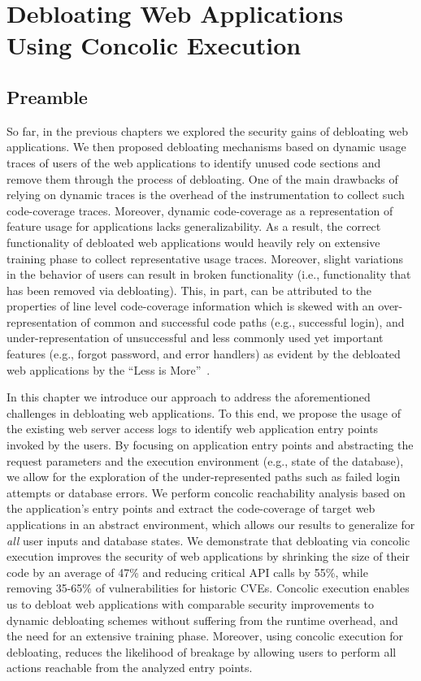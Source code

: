 \chapter{Debloating Web Applications Using Concolic Execution}
\label{chap:ad}
\section*{Preamble}

So far, in the previous chapters we explored the security gains of debloating web applications. 
We then proposed debloating mechanisms based on dynamic usage traces of users of the web applications to identify unused code sections and remove them through the process of debloating. 
One of the main drawbacks of relying on dynamic traces is the overhead of the instrumentation to collect such code-coverage traces. 
Moreover, dynamic code-coverage as a representation of feature usage for applications lacks generalizability. 
As a result, the correct functionality of debloated web applications would heavily rely on extensive training phase to collect representative usage traces. 
Moreover, slight variations in the behavior of users can result in broken functionality (i.e., functionality that has been removed via debloating). 
This, in part, can be attributed to the properties of line level code-coverage information which is skewed with an over-representation of common and successful code paths (e.g., successful login), and under-representation of unsuccessful and less commonly used yet important features (e.g., forgot password, and error handlers) as evident by the debloated web applications by the ``Less is More''~\cite{azad2019less}.

In this chapter we introduce our approach to address the aforementioned challenges in debloating web applications. 
To this end, we propose the usage of the existing web server access logs to identify web application entry points invoked by the users. 
By focusing on application entry points and abstracting the request parameters and the execution environment (e.g., state of the database), we allow for the exploration of the under-represented paths such as failed login attempts or database errors. 
We perform concolic reachability analysis based on the application's entry points and extract the code-coverage of target web applications in an abstract environment, which allows our results to generalize for \emph{all} user inputs and database states. 
We demonstrate that debloating via concolic execution improves the security of web applications by shrinking the size of their code by an average of 47\% and reducing critical API calls by 55\%, while removing 35-65\% of vulnerabilities for historic CVEs. 
Concolic execution enables us to debloat web applications with comparable security improvements to dynamic debloating schemes without suffering from the runtime overhead, and the need for an extensive training phase. 
Moreover, using concolic execution for debloating, reduces the likelihood of breakage by allowing users to perform all actions reachable from the analyzed entry points.


